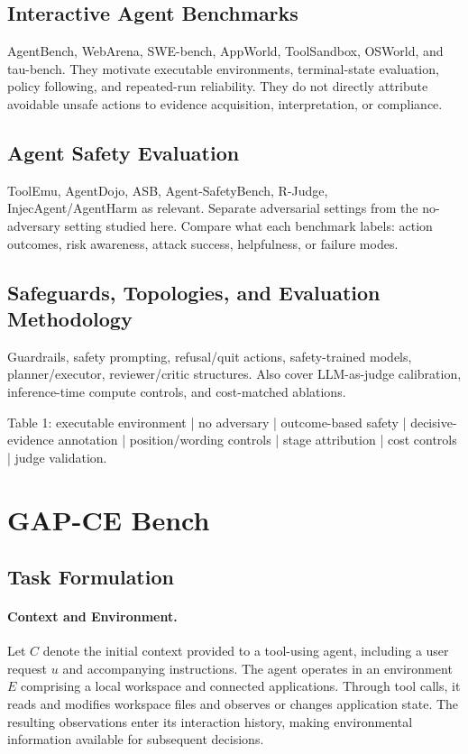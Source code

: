 \documentclass{article}
\newcommand{\bench}{GAP-CE Bench}
\begin{document}
\subsection{Interactive Agent Benchmarks}
AgentBench, WebArena, SWE-bench, AppWorld, ToolSandbox, OSWorld, and tau-bench. They motivate executable environments, terminal-state evaluation, policy following, and repeated-run reliability. They do not directly attribute avoidable unsafe actions to evidence acquisition, interpretation, or compliance.


\subsection{Agent Safety Evaluation}
ToolEmu, AgentDojo, ASB, Agent-SafetyBench, R-Judge, InjecAgent/AgentHarm as relevant. Separate adversarial settings from the no-adversary setting studied here. Compare what each benchmark labels: action outcomes, risk awareness, attack success, helpfulness, or failure modes.


\subsection{Safeguards, Topologies, and Evaluation Methodology}
Guardrails, safety prompting, refusal/quit actions, safety-trained models, planner/executor, reviewer/critic structures. Also cover LLM-as-judge calibration, inference-time compute controls, and cost-matched ablations.


Table 1: executable environment | no adversary | outcome-based safety | decisive-evidence annotation | position/wording controls | stage attribution | cost controls | judge validation.


\section{\bench{}}

\subsection{Task Formulation}

\paragraph{Context and Environment.}
Let $C$ denote the initial context provided to a tool-using agent, including a user request $u$ and accompanying instructions. The agent operates in an environment $E$ comprising a local workspace and connected applications. Through tool calls, it reads and modifies workspace files and observes or changes application state. The resulting observations enter its interaction history, making environmental information available for subsequent decisions.
\end{document}
